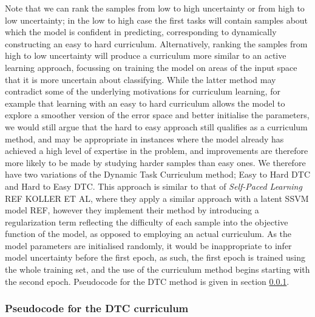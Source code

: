Note that we can rank the samples from low to high uncertainty or from high to low uncertainty; in the low to high case the first tasks will contain samples about which the model is confident in predicting, corresponding to dynamically constructing an easy to hard curriculum. Alternatively, ranking the samples from high to low uncertainty will produce a curriculum more similar to an active learning approach, focussing on training the model on areas of the input space that it is more uncertain about classifying. While the latter method may contradict some of the underlying motivations for curriculum learning, for example that learning with an easy to hard curriculum allows the model to explore a smoother version of the error space and better initialise the parameters, we would still argue that the hard to easy approach still qualifies as a curriculum method, and may be appropriate in instances where the model already has achieved a high level of expertise in the problem, and improvements are therefore more likely to be made by studying harder samples than easy ones.  We therefore have two variations of the Dynamic Task Curriculum method; Easy to Hard DTC and Hard to Easy DTC. This approach is similar to that of \textit{Self-Paced Learning} REF KOLLER ET AL, where they apply a similar approach with a latent SSVM model REF, however they implement their method by introducing a regularization term reflecting the difficulty of each sample into the objective function of the model, as opposed to employing an actual curriculum. As the model parameters are initialised randomly, it would be inappropriate to infer model uncertainty before the first epoch, as such, the first epoch is trained using the whole training set, and the use of the curriculum method begins starting with the second epoch.  Pseudocode for the DTC method is given in section \ref{sec:DTCPseudocode}.

\subsubsection{Pseudocode for the DTC curriculum}\label{sec:DTCPseudocode}

